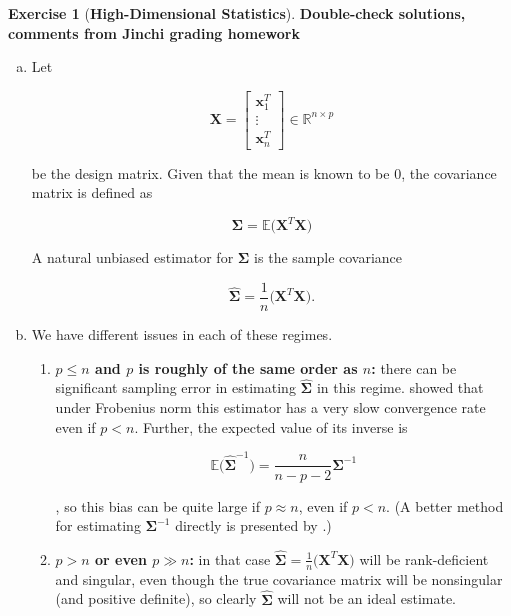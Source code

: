 \documentclass{article}
\theoremstyle{definition}
\newtheorem{exercise}{Exercise}
\theoremstyle{definition}
\theoremstyle{definition}
\theoremstyle{definition}
\newcommand{\E}{\mathbb{E}}
\begin{document}
\begin{exercise}[\textbf{High-Dimensional Statistics}] \textbf{Double-check solutions, comments from Jinchi grading homework}

\begin{enumerate}[(a)]

\item Let 

\[
\boldsymbol{X} = \begin{bmatrix} \boldsymbol{x}_1^T \\ \vdots \\  \boldsymbol{x}_n^T   \end{bmatrix} \in \mathbb{R}^{n \times p}
\]

be the design matrix. Given that the mean is known to be 0, the covariance matrix is defined as 

\[
\boldsymbol{\Sigma} = \E \big(  \boldsymbol{X}^T \boldsymbol{X} \big)
\]

A natural unbiased estimator for \(\boldsymbol{\Sigma}\) is the sample covariance

\[
\widehat{\boldsymbol{\Sigma}} = \frac{1}{n} \big(\boldsymbol{X}^T \boldsymbol{X} \big).
\]

\item We have different issues in each of these regimes.

\begin{enumerate}[(1)]

\item \textbf{\(p \leq n\) and \(p\) is roughly of the same order as \(n\):} there can be significant sampling error in estimating \(\widehat{\boldsymbol{\Sigma}}\) in this regime. \citet{Fan2008} showed that under Frobenius norm this estimator has a very slow convergence rate even if \(p < n\). Further, the expected value of its inverse is

\[
\E  \big(\widehat{\boldsymbol{\Sigma}}^{-1}\big) = \frac{n}{n-p-2}  \boldsymbol{\Sigma}^{-1}
\] 

\citep{Bai2011}, so this bias can be quite large if \(p \approx n\), even if \(p < n\). (A better method for estimating \( \boldsymbol{\Sigma}^{-1}\) directly is presented by \citet{Fan2008}.)

\item \textbf{\(p > n\) or even \(p \gg n\):} in that case \(\widehat{\boldsymbol{\Sigma}} = \frac{1}{n} \big(\boldsymbol{X}^T \boldsymbol{X} \big)\) will be rank-deficient and singular, even though the true covariance matrix will be nonsingular (and positive definite), so clearly \(\widehat{\boldsymbol{\Sigma}}\) will not be an ideal estimate. 


\end{enumerate}
\end{enumerate}
\end{exercise}
\end{document}
